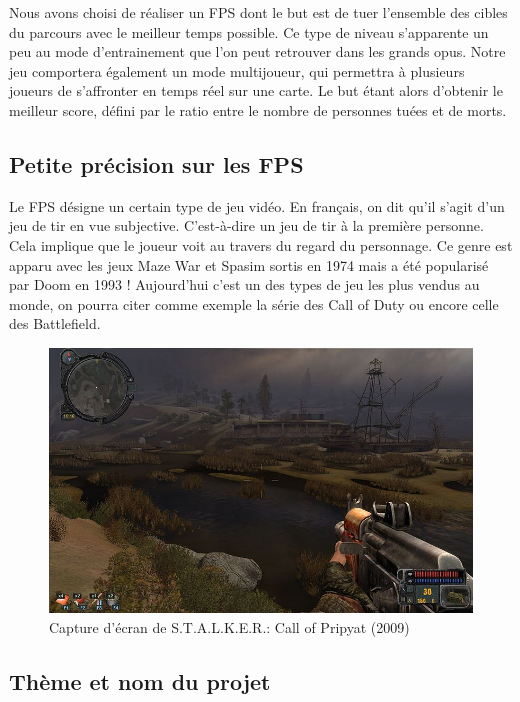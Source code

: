 \documentclass[a4paper, 11pt]{report}
\begin{document}
Nous avons choisi de réaliser un FPS dont le but est de tuer l'ensemble des cibles du parcours avec le meilleur temps possible. Ce type de niveau s'apparente un peu au mode d'entrainement que l'on peut retrouver dans les grands opus. Notre jeu comportera également un mode multijoueur, qui permettra à plusieurs joueurs de s'affronter en temps réel sur une carte. Le but étant alors d'obtenir le meilleur score, défini par le ratio entre le nombre de personnes tuées et de morts.

\subsection{Petite précision sur les FPS}\label{petite-pruxe9cision-sur-les-fps}

Le FPS désigne un certain type de jeu vidéo. En français, on dit qu'il s'agit d'un jeu de tir en vue subjective. C'est-à-dire un jeu de tir à la première personne. Cela implique que le joueur voit au travers du regard du personnage. Ce genre est apparu avec les jeux Maze War et Spasim sortis en 1974 mais a été popularisé par Doom en 1993 ! Aujourd'hui c'est un des types de jeu les plus vendus au monde, on pourra citer comme exemple la série des Call of Duty ou encore celle des Battlefield.

\begin{figure}[htbp]
\centering
\includegraphics[scale=0.4]{exemple_FPS.jpg}
\caption{Capture d'écran de S.T.A.L.K.E.R.: Call of Pripyat (2009)}
\end{figure}

\subsection{Thème et nom du projet}\label{thuxe8mes-et-noms-du-projet}
\end{document}
